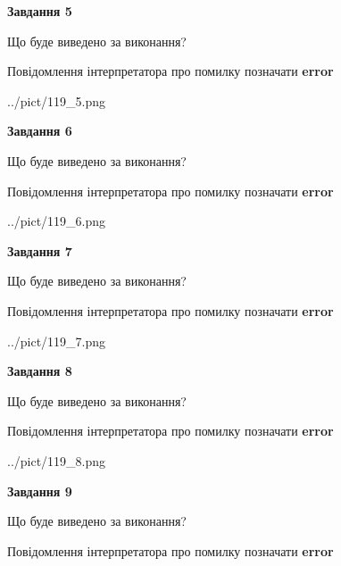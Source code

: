 \documentclass[11pt, ukrainian]{article}
\begin{document}
{\begin {large}
{\begin {center}\textbf{Завдання 5}\end {center}}\par
Що буде виведено за виконання? \par
Повідомлення інтерпретатора про помилку позначати \textbf{error}

\begin{center}
	{../pict/119_5.png}
\end{center}
\newpage

{\begin {center}\textbf{Завдання 6}\end {center}}\par
Що буде виведено за виконання? \par
Повідомлення інтерпретатора про помилку позначати \textbf{error}

\begin{center}
	{../pict/119_6.png}
\end{center}
\newpage

{\begin {center}\textbf{Завдання 7}\end {center}}\par
Що буде виведено за виконання? \par
Повідомлення інтерпретатора про помилку позначати \textbf{error}

\begin{center}
	{../pict/119_7.png}
\end{center}
\newpage

{\begin {center}\textbf{Завдання 8}\end {center}}\par
Що буде виведено за виконання? \par
Повідомлення інтерпретатора про помилку позначати \textbf{error}

\begin{center}
	{../pict/119_8.png}
\end{center}
\newpage

{\begin {center}\textbf{Завдання 9}\end {center}}\par
Що буде виведено за виконання? \par
Повідомлення інтерпретатора про помилку позначати \textbf{error}


\end{large}}
\end{document}
